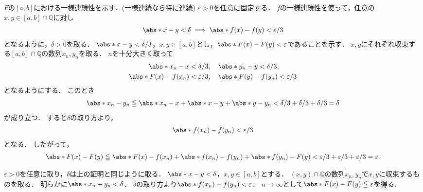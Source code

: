 \begin{tproof}
    $F$の$[a,b]$における一様連続性を示す．(一様連続なら特に連続)
    $\varepsilon >0$を任意に固定する．
    $f$の一様連続性を使って，任意の$x,y \in [a,b] \cap \mathbb{Q}$に対し
    \begin{align*}
        \abs*{x-y} < \delta \implies \abs*{f(x) - f(y)} < \varepsilon/3
    \end{align*}
    となるように，$\delta > 0$を取る．
    $\abs*{x-y} < \delta/3$，$x,y \in [a,b]$とし，$\abs*{F(x)-F(y)} < \varepsilon$であることを示す．
    $x,y$にそれぞれ収束する$[a,b] \cap \mathbb{Q}$の数列$x_n,y_n$を取る．
    $n$を十分大きく取って
    \begin{align*}
        \abs*{x_n-x}       & < \delta/3, \quad \abs*{y_n-y} < \delta/3,                \\
        \abs*{F(x)-f(x_n)} & < \varepsilon/3, \quad \abs*{F(y)-f(y_n)} < \varepsilon/3
    \end{align*}
    となるようにする．
    このとき
    \begin{align*}
        \abs*{x_n-y_n} \le \abs*{x_n-x} + \abs*{x-y} + \abs*{y-y_n} < \delta/3 + \delta/3 + \delta/3 = \delta
    \end{align*}
    が成り立つ．
    すると$\delta$の取り方より，
    \begin{align*}
        \abs*{f(x_n)-f(y_n)} < \varepsilon/3
    \end{align*}
    となる．
    したがって，
    \begin{align*}
        \abs*{F(x)-F(y)} \le \abs*{F(x)-f(x_n)} + \abs*{f(x_n)-f(y_n)} + \abs*{f(y_n)-F(y)}
        < \varepsilon/3 + \varepsilon/3 + \varepsilon/3 = \varepsilon.
    \end{align*}
\end{tproof}
\begin{tproof}
    $\varepsilon>0$を任意に取り，$\delta$は上の証明と同じように取る．
    $\abs*{x-y} < \delta$，$x,y \in [a,b]$とする．
    $(x,y) \cap \mathbb{Q}$の数列$x_n,y_n$で$x,y$に収束するものを取る．
    明らかに$\abs*{x_n-y_n}<\delta$．
    $\delta$の取り方より$\abs*{f(x_n)-f(y_n)}<\varepsilon$．
    $n \to \infty$として$\abs*{F(x)-F(y)} \le \varepsilon$を得る．
\end{tproof}

